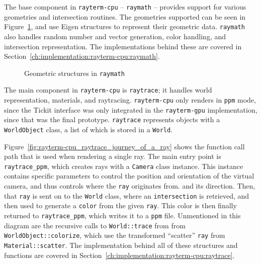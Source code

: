 The base component in \texttt{rayterm-cpu} -- \texttt{raymath} -- provides support for various geometries and intersection routines. The geometries supported can be seen in Figure~\ref{fig:rayterm-cpu_raymath_geometry}, and use Eigen structures to represent their geometric data.
\texttt{raymath} also handles random number and vector generation, color handling, and intersection representation.
The implementations behind these are covered in Section~\ref{ch:implementation:rayterm-cpu:raymath}.

\vspace{0.3em}
\begin{figure}[htb]
  \centering
  \caption{Geometric structures in \texttt{raymath}}
  \label{fig:rayterm-cpu_raymath_geometry}
\end{figure}

The main component in \texttt{rayterm-cpu} is \texttt{raytrace}; it handles world representation, materials, and raytracing.
\texttt{rayterm-cpu} only renders in \texttt{ppm} mode, since the Tickit interface was only integrated in the \texttt{rayterm-gpu} implementation, since that was the final prototype.
\texttt{raytrace} represents objects with a \texttt{WorldObject} class, a list of which is stored in a \texttt{World}.

Figure~\ref{fig:rayterm-cpu_raytrace_journey_of_a_ray} shows the function call path that is used when rendering a single ray.
The main entry point is \texttt{raytrace\_ppm}, which creates rays with a \texttt{Camera} class instance.
This instance contains specific parameters to control the position and orientation of the virtual camera, and thus controls where the \texttt{ray} originates from. and its direction.
Then, that \texttt{ray} is sent on to the \texttt{World} class, where an \texttt{intersection} is retrieved, and then used to generate a \texttt{color} from the given \texttt{ray}.
This color is then finally returned to \texttt{raytrace\_ppm}, which writes it to a \texttt{ppm} file.
Unmentioned in this diagram are the recursive calls to \texttt{World::trace} from from \texttt{WorldObject::colorize}, which use the transformed ``scatter'' \texttt{ray} from \texttt{Material::scatter}.
The implementation behind all of these structures and functions are covered in Section~\ref{ch:implementation:rayterm-cpu:raytrace}.

